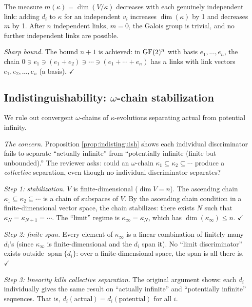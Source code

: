 The measure $m(\kappa) = \dim(V/\kappa)$ decreases with
each genuinely independent link:
adding $d_i$ to $\kappa$ for an independent $v_i$
increases $\dim(\kappa)$ by 1 and decreases $m$ by 1.
After $n$ independent links, $m = 0$, the Galois group
is trivial, and no further independent links are
possible.

\emph{Sharp bound.}
The bound $n + 1$ is achieved: in $\operatorname{GF}(2)^n$ with
basis $e_1, \ldots, e_n$, the chain
$0 \ni e_1 \ni (e_1 + e_2) \ni \cdots \ni
(e_1 + \cdots + e_n)$ has $n$ links with link vectors
$e_1, e_2, \ldots, e_n$ (a basis). $\checkmark$


\subsection{Indistinguishability: $\omega$-chain stabilization}
\label{app:omega-chain}

We rule out convergent $\omega$-chains of
$\kappa$-evolutions separating actual from potential
infinity.

\emph{The concern.}
Proposition \ref{prop:indistinguish} shows each
individual discriminator fails to separate ``actually
infinite'' from ``potentially infinite (finite but
unbounded).'' The reviewer asks: could an $\omega$-chain
$\kappa_1 \subseteq \kappa_2 \subseteq \cdots$ produce
a \emph{collective} separation, even though no individual
discriminator separates?

\emph{Step 1: stabilization.}
$V$ is finite-dimensional ($\dim V = n$). The ascending
chain $\kappa_1 \subseteq \kappa_2 \subseteq \cdots$
is a chain of subspaces of $V$. By the ascending chain
condition in a finite-dimensional vector space, the chain
stabilizes: there exists $N$ such that $\kappa_N =
\kappa_{N+1} = \cdots$. The ``limit'' regime is
$\kappa_\infty = \kappa_N$, which has
$\dim(\kappa_\infty) \leq n$. $\checkmark$

\emph{Step 2: finite span.}
Every element of $\kappa_\infty$ is a linear combination
of finitely many $d_i$'s (since $\kappa_\infty$ is
finite-dimensional and the $d_i$ span it). No ``limit
discriminator'' exists outside $\operatorname{span}
\{d_i\}$: over a finite-dimensional space, the span
is all there is. $\checkmark$

\emph{Step 3: linearity kills collective separation.}
The original argument shows: each $d_i$ individually
gives the same result on ``actually infinite'' and
``potentially infinite'' sequences. That is,
$d_i(\text{actual}) = d_i(\text{potential})$ for all $i$.

